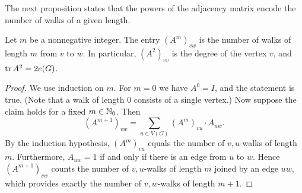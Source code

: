 The next proposition states that the powers of the adjacency matrix encode the number of walks of a given length.

\begin{proposition} \label{prop:count-walks}
    Let $m$ be a nonnegative integer. 
    The entry $(A^m)_{vw}$ is the number of walks of length $m$ from $v$ to $w$. 
    In particular, $(A^2)_{vv}$ is the degree of the vertex $v$, and $\operatorname{tr} A^2 = 2 e(G)$.
\end{proposition}

\begin{proof}
    We use induction on $m$. For $m = 0$ we have $A^0 = I$, and the statement is true. (Note that a walk of length 0 consists of a single vertex.)
    Now suppose the claim holds for a fixed $m \in \mathbb{N}_0$.
    Then
    \begin{equation*}
        (A^{m + 1})_{vw} = \sum \limits_{u \in V(G)} (A^m)_{vu} \cdot A_{uw}.
    \end{equation*}
    By the induction hypothesis, $(A^m)_{vu}$ equals the number of $v, u$-walks of length $m$. 
    Furthermore, $A_{uw} = 1$ if and only if there is an edge from $u$ to $w$.
    Hence $(A^{m + 1})_{vw}$ counts the number of $v, u$-walks of length $m$ joined by an edge $u w$, which provides exactly the number of $v, w$-walks of length $m + 1$.
\end{proof}



